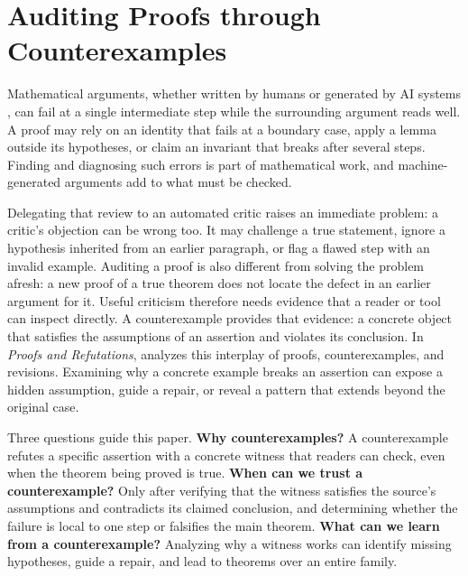 \section{Auditing Proofs through Counterexamples}
\label{sec:introduction}
Mathematical arguments, whether written by humans or generated by AI systems \citep{hubert2025alphaproof,feng2026firstproof}, can fail at a single intermediate step while the surrounding argument reads well. A proof may rely on an identity that fails at a boundary case, apply a lemma outside its hypotheses, or claim an invariant that breaks after several steps. Finding and diagnosing such errors is part of mathematical work, and machine-generated arguments add to what must be checked.

Delegating that review to an automated critic raises an immediate problem: a critic's objection can be wrong too. It may challenge a true statement, ignore a hypothesis inherited from an earlier paragraph, or flag a flawed step with an invalid example. Auditing a proof is also different from solving the problem afresh: a new proof of a true theorem does not locate the defect in an earlier argument for it. Useful criticism therefore needs evidence that a reader or tool can inspect directly. A counterexample provides that evidence: a concrete object that satisfies the assumptions of an assertion and violates its conclusion. In \emph{Proofs and Refutations}, \citet{lakatos1976proofs} analyzes this interplay of proofs, counterexamples, and revisions. Examining why a concrete example breaks an assertion can expose a hidden assumption, guide a repair, or reveal a pattern that extends beyond the original case.

Three questions guide this paper. \textbf{Why counterexamples?} A counterexample refutes a specific assertion with a concrete witness that readers can check, even when the theorem being proved is true. \textbf{When can we trust a counterexample?} Only after verifying that the witness satisfies the source's assumptions and contradicts its claimed conclusion, and determining whether the failure is local to one step or falsifies the main theorem. \textbf{What can we learn from a counterexample?} Analyzing why a witness works can identify missing hypotheses, guide a repair, and lead to theorems over an entire family.

